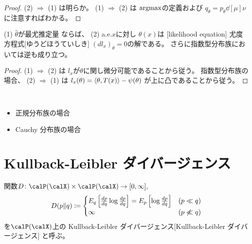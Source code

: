 \documentclass[report]{jlreq}
\begin{document}
\begin{proof}
    (2) $\Rightarrow$ (1) は明らか。
    (1) $\Rightarrow$ (2) は
    $\operatorname{argmax}$の定義および
    $q_\theta = p_\theta \dd[\mu]{\nu}$に注意すればわかる。
\end{proof}

\begin{proposition}[尤度方程式]
    (1) $\hat{\theta}$が最尤推定量
    ならば、
    (2) a.e.$x$に対し
    $\hat{\theta}(x)$は
    [likelihood equation]
        {尤度方程式}[ゆうどほうていしき]
    $(dl_x)_\theta = 0$の解である。
    さらに指数型分布族においては逆も成り立つ。
\end{proposition}

\begin{proof}
    (1) $\Rightarrow$ (2) は
    $l_x$が$\theta$に関し微分可能であることから従う。
    指数型分布族の場合、
    (2) $\Rightarrow$ (1) は
    $l_x(\theta) = \left\langle{\theta},{T(x)}\right\rangle - \psi(\theta)$
    が上に凸であることから従う。
\end{proof}

\begin{example}[最尤推定量の例]
    ~
    \begin{itemize}
        \item 正規分布族の場合
        \item Cauchy 分布族の場合
    \end{itemize}
\end{example}

%
\section{Kullback-Leibler ダイバージェンス}

\begin{definition}
    関数$D \colon \calP(\calX) \times \calP(\calX) \to [0, \infty],$
    \begin{equation}
        D(p \| q)
            \coloneqq
                \begin{cases}
                    E_q \left[{
                        \frac{dp}{dq}
                        \log \frac{dp}{dq}
                    }\right]
                        =
                            E_p \left[{
                                \log \frac{dp}{dq}
                            }\right]
                        & (p \ll q) \\
                    \infty
                        & (p \not\ll q)
                \end{cases}
    \end{equation}
    を$\calP(\calX)$上の
        {Kullback-Leibler ダイバージェンス}[Kullback-Leibler ダイバージェンス]
    と呼ぶ。
\end{definition}
\end{document}

